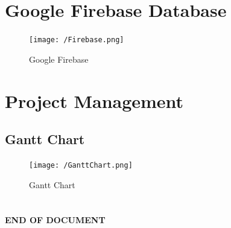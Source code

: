 \documentclass[oneside]{report}
\begin{document}
	\chapter{Google Firebase Database}
			\begin{figure}[H]
				\texttt{[image: /Firebase.png]}
				\caption[Google Firebase]{Google Firebase}
			\end{figure}
			
	\chapter{Project Management}
		\section{Gantt Chart}
			\begin{figure}[H]
				\texttt{[image: /GanttChart.png]}
				\caption[Gantt Chart]{Gantt Chart}
			\end{figure}
			
\chapter*{}
\vfill
\begin{center}
\textbf{END OF DOCUMENT}
\end{center}
\vfill
\end{document}
